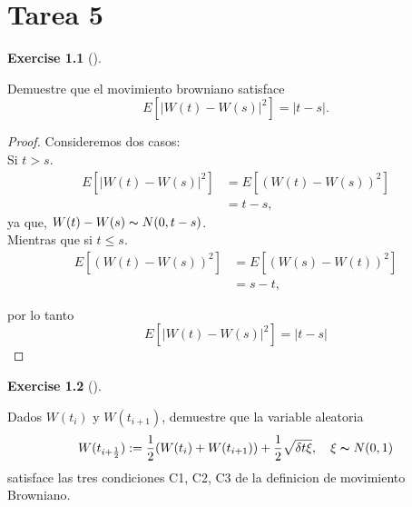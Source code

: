 \documentclass[
  letterpaper,
  DIV=11,
  numbers=noendperiod]{scrreprt}
\theoremstyle{definition}
\newtheorem{exercise}{Exercise}[chapter]
\theoremstyle{plain}
\theoremstyle{remark}
\begin{document}

\hypertarget{tarea-5}{%
\chapter{Tarea 5}\label{tarea-5}}

\begin{exercise}[]\protect\hypertarget{exr-1}{}\label{exr-1}

Demuestre que el movimiento browniano satisface \[
E[|W(t)-W(s)|^{2}]=|t-s|.
\]

\end{exercise}

\begin{proof}

Consideremos dos casos:\\
Si \(t>s\). \[
\begin{align*}
E\left[\left|W\left(t\right)-W\left(s\right)\right|^{2}\right] & =E\left[\left(W\left(t\right)-W\left(s\right)\right)^{2}\right]\\
 & =t-s,
\end{align*}
\] ya que, \(W(t)-W(s)\thicksim N(0,t-s)\).\\
Mientras que si \(t\leq s\). \[
\begin{align*}
E\left[\left(W\left(t\right)-W\left(s\right)\right)^{2}\right] & =E\left[\left(W\left(s\right)-W\left(t\right)\right)^{2}\right]\\
 & =s-t,
\end{align*}
\]

por lo tanto \[
E\left[\left|W\left(t\right)-W\left(s\right)\right|^{2}\right]=\left|t-s\right|
\]

\end{proof}

\begin{exercise}[]\protect\hypertarget{exr-2}{}\label{exr-2}

Dados \(W(t_{i})\) y \(W(t_{i+1})\), demuestre que la variable aleatoria
\[
W(t_{i+\frac{1}{2}}):=\frac{1}{2}(W(t_{i})+W(t_{i+1}))+\frac{1}{2}\sqrt{\delta t\xi},\quad\xi\thicksim N(0,1)
\] satisface las tres condiciones C1, C2, C3 de la definicion de
movimiento Browniano.

\end{exercise}
\end{document}
